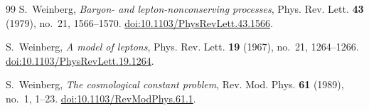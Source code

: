 \documentclass[11pt,reqno]{amsart}
\theoremstyle{definition}
\begin{document}
\begin{thebibliography}{99}
S.~Weinberg,
\emph{Baryon- and lepton-nonconserving processes},
Phys. Rev. Lett. \textbf{43} (1979), no.~21, 1566--1570.
\href{https://doi.org/10.1103/PhysRevLett.43.1566}{doi:10.1103/PhysRevLett.43.1566}.

S.~Weinberg,
\emph{A model of leptons},
Phys. Rev. Lett. \textbf{19} (1967), no.~21, 1264--1266.
\href{https://doi.org/10.1103/PhysRevLett.19.1264}{doi:10.1103/PhysRevLett.19.1264}.

S.~Weinberg,
\emph{The cosmological constant problem},
Rev. Mod. Phys. \textbf{61} (1989), no.~1, 1--23.
\href{https://doi.org/10.1103/RevModPhys.61.1}{doi:10.1103/RevModPhys.61.1}.

\end{thebibliography}
\end{document}
